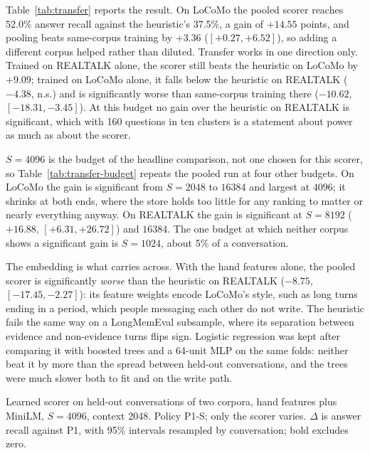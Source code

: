 Table~\ref{tab:transfer} reports the result. On LoCoMo the pooled scorer
reaches 52.0\% answer recall against the heuristic's 37.5\%, a gain of
$+14.55$ points, and pooling beats same-corpus training by $+3.36$
($[+0.27, +6.52]$), so adding a different corpus helped rather than diluted.
Transfer works in one direction only. Trained on REALTALK alone, the scorer
still beats the heuristic on LoCoMo by $+9.09$; trained on LoCoMo alone, it
falls below the heuristic on REALTALK ($-4.38$, n.s.) and is significantly
worse than same-corpus training there ($-10.62$, $[-18.31, -3.45]$). At this
budget no gain over the heuristic on REALTALK is significant, which with 160
questions in ten clusters is a statement about power as much as about the
scorer.

$S=4096$ is the budget of the headline comparison, not one chosen for this
scorer, so Table~\ref{tab:transfer-budget} repeats the pooled run at four
other budgets. On LoCoMo the gain is significant from $S=2048$ to $16384$ and
largest at $4096$; it shrinks at both ends, where the store holds too little
for any ranking to matter or nearly everything anyway. On REALTALK the gain is
significant at $S=8192$ ($+16.88$, $[+6.31, +26.72]$) and $16384$. The one
budget at which neither corpus shows a significant gain is $S=1024$, about
5\% of a conversation.

The embedding is what carries across. With the hand features alone, the
pooled scorer is significantly \emph{worse} than the heuristic on REALTALK
($-8.75$, $[-17.45, -2.27]$): its feature weights encode LoCoMo's style, such
as long turns ending in a period, which people messaging each other do not
write. The heuristic fails the same way on a LongMemEval
subsample, where its separation between evidence and non-evidence turns
flips sign. Logistic regression was kept after comparing
it with boosted trees and a 64-unit MLP on the same folds: neither beat it by
more than the spread between held-out conversations, and the trees were much
slower both to fit and on the write path.

\begin{table}[t]
\caption{Learned scorer on held-out conversations of two corpora, hand
features plus MiniLM, $S=4096$, context 2048. Policy P1-S; only the scorer
varies. $\Delta$ is answer recall against P1, with 95\% intervals resampled by
conversation; bold excludes zero.}
\label{tab:transfer}
\centering
\small
\begin{adjustbox}{max width=\columnwidth}\end{adjustbox}
\end{table}

